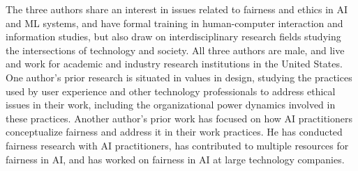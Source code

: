 \documentclass[acmsmall]{acmart}
\begin{document}
The three authors share an interest in issues related to fairness and ethics in AI and ML systems, and have formal training in human-computer interaction and information studies, but also draw on interdisciplinary research fields studying the intersections of technology and society. All three authors are male, and live and work for academic and industry research institutions in the United States.
One author's %
prior research is situated in values in design, studying the practices used by user experience and other technology professionals to address ethical issues in their work, including the organizational power dynamics involved in these practices. %
Another author's prior work has focused on how AI practitioners conceptualize fairness and address it in their work practices. He has conducted fairness research with AI practitioners, has contributed to %
multiple resources for fairness in AI, and has worked on fairness in AI at large technology companies.
\end{document}
